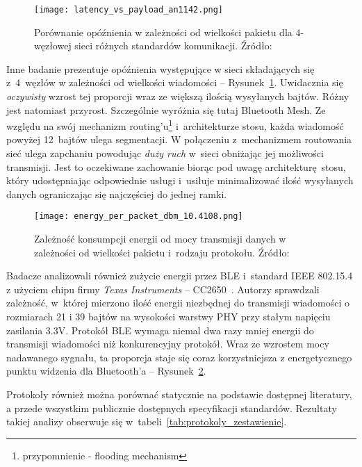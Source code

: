 \begin{figure}[!ht]
	\centering \texttt{[image: latency\_vs\_payload\_an1142.png]} 
	\caption{Porównanie opóźnienia w zależności od wielkości pakietu dla 4-węzłowej sieci różnych standardów komunikacji. Źródło: \cite{noauthor_an1142_nodate}}
	\label{rys:latency_vs_payload_an1142}
\end{figure}

Inne badanie prezentuje opóźnienia występujące w sieci składających się z~4~węzłów w zależności od wielkości
wiadomości -- Rysunek~\ref{rys:latency_vs_payload_an1142}. Uwidacznia się \textit{oczywisty}
wzrost tej proporcji wraz ze większą ilością wysyłanych bajtów. Różny jest natomiast przyrost. Szczególnie wyróżnia się
tutaj Bluetooth Mesh. Ze względu na swój mechanizm routing'u\footnote{przypomnienie - flooding mechanism}
i~architekturze stosu, każda wiadomość powyżej 12~bajtów ulega segmentacji. W połączeniu z~mechanizmem routowania
sieć ulega zapchaniu powodując \textit{duży ruch} w~sieci obniżając jej możliwości transmisji. Jest to oczekiwane 
zachowanie biorąc pod uwagę architekturę stosu, który udostępniając odpowiednie usługi i~usiłuje minimalizować
ilość wysyłanych danych ograniczając się najczęściej do jednej ramki.%

\begin{figure}[!ht]
	\centering \texttt{[image: energy\_per\_packet\_dbm\_10.4108.png]} 
	\caption{Zależność konsumpcji energii od mocy transmisji danych w zależności od wielkości pakietu i~rodzaju protokołu. Źródło: \cite{fafoutis_ble_2016}}
	\label{rys:energy_per_packet_dbm_10.4108}
\end{figure}

Badacze analizowali również zużycie energii przez \gls{BLE} i~standard IEEE 802.15.4 z użyciem chipu
firmy \textit{Texas Instruments} -- CC2650~\cite{fafoutis_ble_2016}. Autorzy sprawdzali zależność, w~której
mierzono ilość energii niezbędnej do transmisji wiadomości o rozmiarach 21 i 39 bajtów na wysokości warstwy PHY przy
stałym napięciu zasilania 3.3V. Protokół BLE wymaga niemal dwa razy mniej energii do transmisji wiadomości
niż konkurencyjny protokół. Wraz ze wzrostem mocy nadawanego sygnału, ta proporcja staje się coraz korzystniejsza
z energetycznego punktu widzenia dla Bluetooth'a -- Rysunek~\ref{rys:energy_per_packet_dbm_10.4108}.

Protokoły również można porównać statycznie na podstawie dostępnej literatury, a przede wszystkim
publicznie dostępnych specyfikacji standardów. Rezultaty takiej analizy obserwuje się w~tabeli~\ref{tab:protokoly_zestawienie}.

